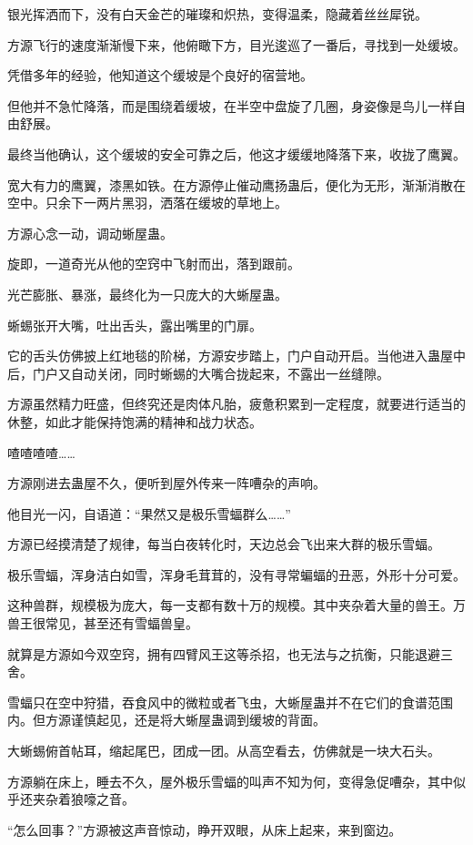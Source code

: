 \begin{this_body}
银光挥洒而下，没有白天金芒的璀璨和炽热，变得温柔，隐藏着丝丝犀锐。

方源飞行的速度渐渐慢下来，他俯瞰下方，目光逡巡了一番后，寻找到一处缓坡。

凭借多年的经验，他知道这个缓坡是个良好的宿营地。

但他并不急忙降落，而是围绕着缓坡，在半空中盘旋了几圈，身姿像是鸟儿一样自由舒展。

最终当他确认，这个缓坡的安全可靠之后，他这才缓缓地降落下来，收拢了鹰翼。

宽大有力的鹰翼，漆黑如铁。在方源停止催动鹰扬蛊后，便化为无形，渐渐消散在空中。只余下一两片黑羽，洒落在缓坡的草地上。

方源心念一动，调动蜥屋蛊。

旋即，一道奇光从他的空窍中飞射而出，落到跟前。

光芒膨胀、暴涨，最终化为一只庞大的大蜥屋蛊。

蜥蜴张开大嘴，吐出舌头，露出嘴里的门扉。

它的舌头仿佛披上红地毯的阶梯，方源安步踏上，门户自动开启。当他进入蛊屋中后，门户又自动关闭，同时蜥蜴的大嘴合拢起来，不露出一丝缝隙。

方源虽然精力旺盛，但终究还是肉体凡胎，疲惫积累到一定程度，就要进行适当的休整，如此才能保持饱满的精神和战力状态。

喳喳喳喳……

方源刚进去蛊屋不久，便听到屋外传来一阵嘈杂的声响。

他目光一闪，自语道：“果然又是极乐雪蝠群么……”

方源已经摸清楚了规律，每当白夜转化时，天边总会飞出来大群的极乐雪蝠。

极乐雪蝠，浑身洁白如雪，浑身毛茸茸的，没有寻常蝙蝠的丑恶，外形十分可爱。

这种兽群，规模极为庞大，每一支都有数十万的规模。其中夹杂着大量的兽王。万兽王很常见，甚至还有雪蝠兽皇。

就算是方源如今双空窍，拥有四臂风王这等杀招，也无法与之抗衡，只能退避三舍。

雪蝠只在空中狩猎，吞食风中的微粒或者飞虫，大蜥屋蛊并不在它们的食谱范围内。但方源谨慎起见，还是将大蜥屋蛊调到缓坡的背面。

大蜥蜴俯首帖耳，缩起尾巴，团成一团。从高空看去，仿佛就是一块大石头。

方源躺在床上，睡去不久，屋外极乐雪蝠的叫声不知为何，变得急促嘈杂，其中似乎还夹杂着狼嚎之音。

“怎么回事？”方源被这声音惊动，睁开双眼，从床上起来，来到窗边。


\end{this_body}
